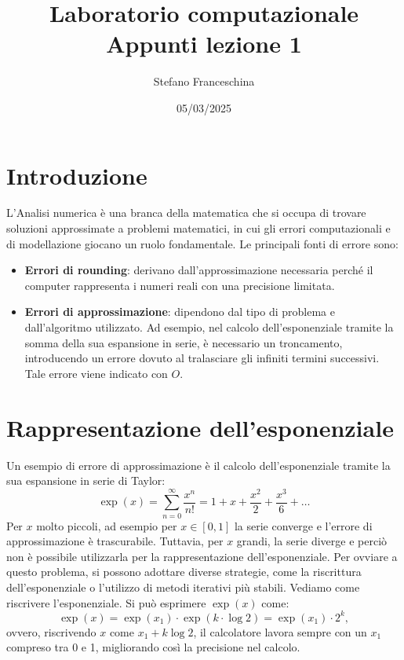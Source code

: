 \documentclass{article}
\title{Laboratorio computazionale \\[1ex] \large Appunti lezione 1}
\author{Stefano Franceschina}
\date{05/03/2025}
\begin{document}
\maketitle

\section{Introduzione}
    L'Analisi numerica è una branca della matematica che si occupa di trovare soluzioni approssimate a problemi matematici, 
    in cui gli errori computazionali e di modellazione giocano un ruolo fondamentale. Le principali fonti di errore sono:
    \begin{itemize}
        \item \textbf{Errori di rounding}: derivano dall'approssimazione necessaria perché il computer rappresenta i numeri 
        reali con una precisione limitata.
        \item \textbf{Errori di approssimazione}: dipendono dal tipo di problema e dall'algoritmo utilizzato. Ad esempio, 
        nel calcolo dell'esponenziale tramite la somma della sua espansione in serie, è necessario un troncamento, 
        introducendo un errore dovuto al tralasciare gli infiniti termini successivi. Tale errore viene indicato con $O$.
    \end{itemize}

\section{Rappresentazione dell'esponenziale}
    Un esempio di errore di approssimazione è il calcolo dell'esponenziale tramite la sua espansione in serie di Taylor:
    \[
        \exp(x) = \sum_{n=0}^{\infty} \frac{x^n}{n!} = 1 + x + \frac{x^2}{2} + \frac{x^3}{6} + \ldots
    \]
    Per $x$ molto piccoli, ad esempio per $x \in [0, 1]$ la serie converge e l'errore di approssimazione è 
    trascurabile. Tuttavia, per $x$ grandi, la serie diverge e perciò non è possibile utilizzarla per la 
    rappresentazione dell'esponenziale. Per ovviare a questo problema, si possono adottare diverse strategie, 
    come la riscrittura dell'esponenziale o l'utilizzo di metodi iterativi più 
    stabili. Vediamo come riscrivere l'esponenziale. Si può esprimere $\exp(x)$ come:
    \[
        \exp(x) = \exp(x_1) \cdot \exp(k \cdot \log 2) = \exp(x_1) \cdot 2^k,
    \]
    ovvero, riscrivendo $x$ come $x_1 + k \log 2$, il calcolatore lavora sempre con un $x_1$ compreso tra 0 e 1, 
    migliorando così la precisione nel calcolo.
\end{document}
